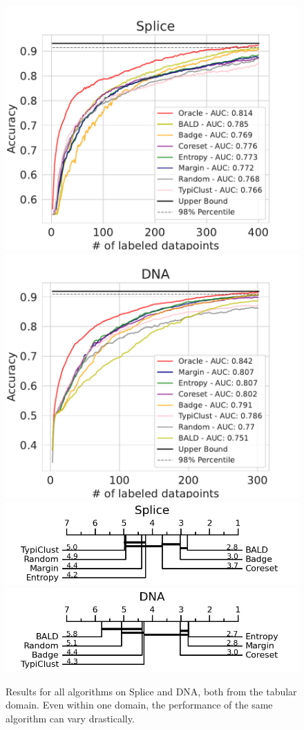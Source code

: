 \documentclass[]{article}
\begin{document}
\begin{figure}
	\centering
	\includegraphics[width=0.49\linewidth]{img/eval_splice}
	\hspace{1mm}
	\includegraphics[width=0.49\linewidth]{img/eval_dna}\\[2mm]
	\includegraphics[width=0.49\linewidth]{img/micro_splice}
	\hspace{1mm}
	\includegraphics[width=0.49\linewidth]{img/micro_dna}
	\caption{Results for all algorithms on Splice and DNA, both from the tabular domain. Even within one domain, the performance of the same algorithm can vary drastically.}
	\label{fig:eval_vector}
\end{figure}
%
\end{document}
